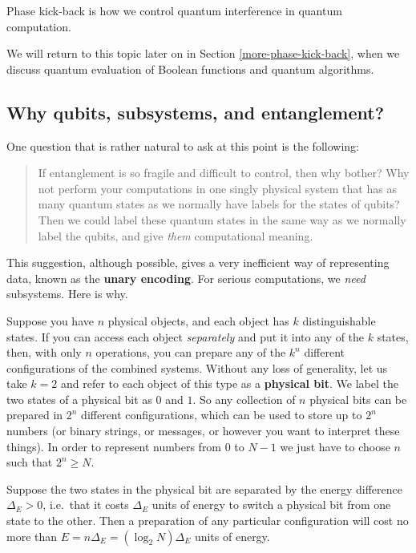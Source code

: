 \documentclass[fleqn,a4paper]{article}
\renewcommand{\footnote}[1]{\sidenotetext[{\color{white}0}\!\!]{\footnotesize #1}}
\newenvironment{idea}{\everypar{\setlength{\parindent}{1.5em}}}{}
\theoremstyle{definition}
\theoremstyle{definition}
\theoremstyle{definition}
\theoremstyle{definition}
\theoremstyle{remark}
\begin{document}
\begin{idea}
Phase kick-back is how we control quantum interference in quantum computation.

\end{idea}

We will return to this topic later on in Section \ref{more-phase-kick-back}, when we discuss quantum evaluation of Boolean functions and quantum algorithms.

\hypertarget{why-qubits-subsystems-and-entanglement}{%
\subsection{Why qubits, subsystems, and entanglement?}\label{why-qubits-subsystems-and-entanglement}}

One question that is rather natural to ask at this point is the following:

\begin{quote}
If entanglement is so fragile and difficult to control, then why bother?
Why not perform your computations in one singly physical system that has as many quantum states as we normally have labels for the states of qubits?
Then we could label these quantum states in the same way as we normally label the qubits, and give \emph{them} computational meaning.
\end{quote}

This suggestion, although possible, gives a very inefficient way of representing data, known as the \textbf{unary encoding}.
For serious computations, we \emph{need} subsystems.
Here is why.

Suppose you have \(n\) physical objects, and each object has \(k\) distinguishable states.
If you can access each object \emph{separately} and put it into any of the \(k\) states, then, with only \(n\) operations, you can prepare any of the \(k^{n}\) different configurations of the combined systems.
Without any loss of generality, let us take \(k=2\) and refer to each object of this type as a \textbf{physical bit}.
We label the two states of a physical bit as \(0\) and \(1\).
So any collection of \(n\) physical bits can be prepared in \(2^{n}\) different configurations, which can be used to store up to \(2^{n}\) numbers (or binary strings, or messages, or however you want to interpret these things).
In order to represent numbers from \(0\) to \(N-1\) we just have to choose \(n\) such that \(2^n\geqslant N\).

Suppose the two states in the physical bit are separated by the energy difference \(\Delta_E>0\), i.e.~that it costs \(\Delta_E\) units of energy to switch a physical bit from one state to the other.
Then a preparation of any particular configuration will cost no more than \(E=n \Delta_E=(\log_2 N)\Delta_E\) units of energy.\footnote{For simplicity here, we're assuming that \(N=2^n\).}
\end{document}
